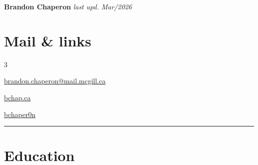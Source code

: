 \documentclass[margin,line]{resume}
\begin{document}
{\Large \textbf{Brandon Chaperon} \hfill\footnotesize {\it last upd. Mar/2026} \hphantom{.............................}}
\begin{resume}

	\vspace{-0.5em}

	\section{\mysidestyle Mail \& links}
	
	\vspace{-0.01em}
	\begin{multicols}{3}

		\faAt{}\hspace{0.1em} \href{mailto:brandon.chaperon@mail.mcgill.ca}{brandon.chaperon@mail.mcgill.ca}%

		\begin{center}\faChain{}\hspace{0.1em} \href{https://bchap.ca/}{bchap.ca}\end{center}

		\faGithub{}\hspace{0.1em} \href{https://github.com/bchaper0n}{bchaper0n}
	\end{multicols}



	\vspace{-2.3em}\rule{\columnwidth}{0.4pt}


	\vspace{-0.7em}

	\section{\mysidestyle Education}


\end{resume}
\end{document}
